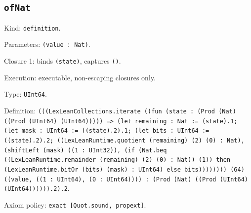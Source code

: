 \documentclass[11pt]{article}
\begin{document}
\subsection*{\texttt{ofNat}}
\noindent Kind: \texttt{definition}.\par
\noindent Parameters: \texttt{(value : Nat)}.\par
\noindent Closure 1: binds \texttt{(state)}, captures \texttt{()}.\par
\noindent Execution: executable, non-escaping closures only.\par
\noindent Type: \texttt{UInt64}.\par
\noindent Definition: \texttt{(((LexLeanCollections.iterate ((fun (state : (Prod (Nat) ((Prod (UInt64) (UInt64))))) => (let remaining : Nat := (state).1; (let mask : UInt64 := ((state).2).1; (let bits : UInt64 := ((state).2).2; ((LexLeanRuntime.quotient (remaining) (2) (0) : Nat), (shiftLeft (mask) ((1 : UInt32)), (if (Nat.beq ((LexLeanRuntime.remainder (remaining) (2) (0) : Nat)) (1)) then (LexLeanRuntime.bitOr (bits) (mask) : UInt64) else bits)))))))) (64) ((value, ((1 : UInt64), (0 : UInt64)))) : (Prod (Nat) ((Prod (UInt64) (UInt64)))))).2).2}.\par
\noindent Axiom policy: \texttt{exact [Quot.sound, propext]}.\par
\end{document}
